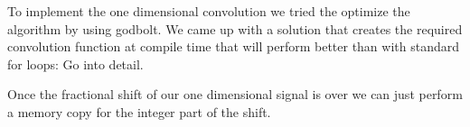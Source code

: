 \documentclass[]{usiinfbachelorproject}
\begin{document}
		
	
	
	To implement the one dimensional convolution we tried the optimize the algorithm by using godbolt. We came up with a solution that creates the required convolution function at compile time that will perform better than with standard for loops: Go into detail.
	
	Once the fractional shift of our one dimensional signal is over we can just perform a memory copy for the integer part of the shift.
	
	
	
	
	

	
	
	
	
\end{document}

